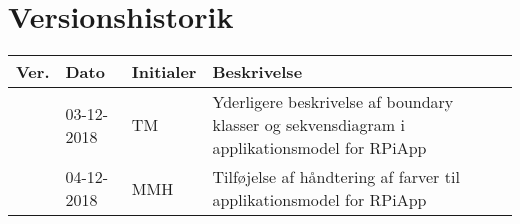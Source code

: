 \documentclass[Arkitektur/System_main.tex]{subfiles}
\begin{document}
\section{Versionshistorik}
\begin{longtable}{|L{0.07\textwidth}|L{0.15\textwidth}|L{0.13\textwidth}|L{0.55\textwidth}|}
        \hline
        \textbf{Ver.} & \textbf{Dato} & \textbf{Initialer} & \textbf{Beskrivelse}  \\ \hline
         & 03-12-2018 & TM & Yderligere beskrivelse af boundary klasser og sekvensdiagram i applikationsmodel for RPiApp \\ \hline
         & 04-12-2018 & MMH & Tilføjelse af håndtering af farver til applikationsmodel for RPiApp \\ \hline
\end{longtable}
\end{document}
